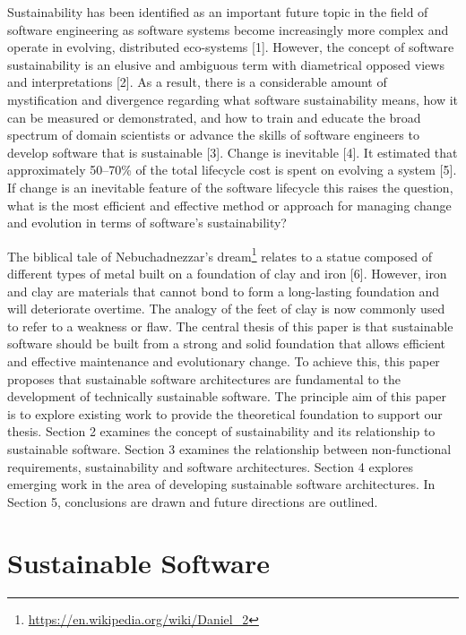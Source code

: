 \documentclass[preprint,12pt,authoryear]{elsarticle}
\begin{document}
Sustainability has been identified as an important future topic in the
field of software engineering as software systems become increasingly
more complex and operate in evolving, distributed eco-systems
[1]. However, the concept of software sustainability is an elusive and
ambiguous term with diametrical opposed views and interpretations
[2]. As a result, there is a considerable amount of mystification and
divergence regarding what software sustainability means, how it can be
measured or demonstrated, and how to train and educate the broad
spectrum of domain scientists or advance the skills of software
engineers to develop software that is sustainable [3].  Change is
inevitable [4]. It estimated that approximately 50--70\% of the total
lifecycle cost is spent on evolving a system [5]. If change is an
inevitable feature of the software lifecycle this raises the question,
what is the most efficient and effective method or approach for
managing change and evolution in terms of software’s sustainability?

The biblical tale of Nebuchadnezzar's
dream\footnote{\url{https://en.wikipedia.org/wiki/Daniel_2}} relates
to a statue composed of different types of metal built on a foundation
of clay and iron [6]. However, iron and clay are materials that cannot
bond to form a long-lasting foundation and will deteriorate
overtime. The analogy of the feet of clay is now commonly used to
refer to a weakness or flaw. The central thesis of this paper is that
sustainable software should be built from a strong and solid
foundation that allows efficient and effective maintenance and
evolutionary change. To achieve this, this paper proposes that
sustainable software architectures are fundamental to the development
of technically sustainable software. The principle aim of this paper
is to explore existing work to provide the theoretical foundation to
support our thesis. Section 2 examines the concept of sustainability
and its relationship to sustainable software. Section 3 examines the
relationship between non-functional requirements, sustainability and
software architectures. Section 4 explores emerging work in the area
of developing sustainable software architectures. In Section 5,
conclusions are drawn and future directions are outlined.


\section{Sustainable Software}\label{sec:sussoft}
\end{document}
